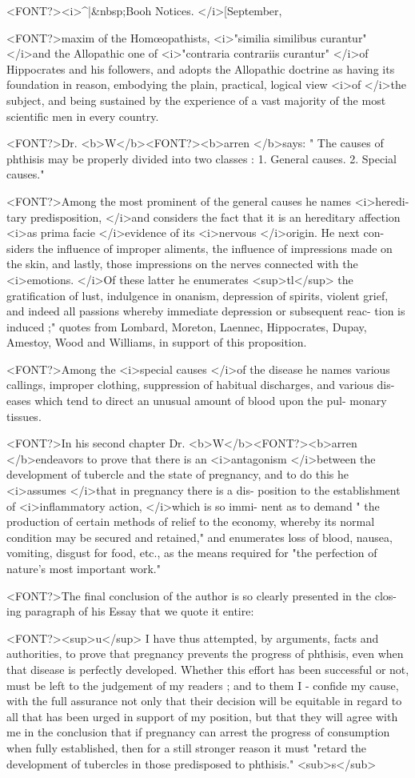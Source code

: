 <FONT?><i>^|&nbsp;Booh Notices. </i>[September,

<FONT?>maxim of the Homœopathists, <i>"similia similibus curantur" </i>and the
Allopathic one of <i>"contraria contrariis curantur" </i>of Hippocrates
and his followers, and adopts the Allopathic doctrine as having its
foundation in reason, embodying the plain, practical, logical view <i>of
</i>the subject, and being sustained by the experience of a vast majority of
the most scientific men in every country.

<FONT?>Dr. <b>W</b><FONT?><b>arren </b>says: " The causes of phthisis may be properly divided
into two classes :   1. General causes.   2. Special causes."

<FONT?>Among the most prominent of the general causes he names <i>heredi-
tary predisposition, </i>and considers the fact that it is an hereditary
affection <i>as prima facie </i>evidence of its <i>nervous </i>origin. He next con-
siders the influence of improper aliments, the influence of impressions
made on the skin, and lastly, those impressions on the nerves connected
with the <i>emotions. </i>Of these latter he enumerates <sup>tl</sup> the gratification
of lust, indulgence in onanism, depression of spirits, violent grief, and
indeed all passions whereby immediate depression or subsequent reac-
tion is induced ;" quotes from Lombard, Moreton, Laennec, Hippocrates,
Dupay, Amestoy, Wood and Williams, in support of this proposition.

<FONT?>Among the <i>special causes </i>of the disease he names various callings,
improper clothing, suppression of habitual discharges, and various dis-
eases which tend to direct an unusual amount of blood upon the pul-
monary tissues.

<FONT?>In his second chapter Dr. <b>W</b><FONT?><b>arren </b>endeavors to prove that there is
an <i>antagonism </i>between the development of tubercle and the state of
pregnancy, and to do this he <i>assumes </i>that in pregnancy there is a dis-
position to the establishment of <i>inflammatory action, </i>which is so immi-
nent as to demand " the production of certain methods of relief to the
economy, whereby its normal condition may be secured and retained,"
and enumerates loss of blood, nausea, vomiting, disgust for food, etc., as
the means required for "the perfection of nature's most important work."

<FONT?>The final conclusion of the author is so clearly presented in the clos-
ing paragraph of his Essay that we quote it entire:

<FONT?><sup>u</sup> I have thus attempted, by arguments, facts and authorities, to
prove that pregnancy prevents the progress of phthisis, even when that
disease is perfectly developed. Whether this effort has been successful
or not, must be left to the judgement of my readers ; and to them I
- confide my cause, with the full assurance not only that their decision
will be equitable in regard to all that has been urged in support of my
position, but that they will agree with me in the conclusion that if
pregnancy can arrest the progress of consumption when fully established,
then for a still stronger reason it must "retard the development of
tubercles in those predisposed to phthisis." <sub>s</sub>\endinput
